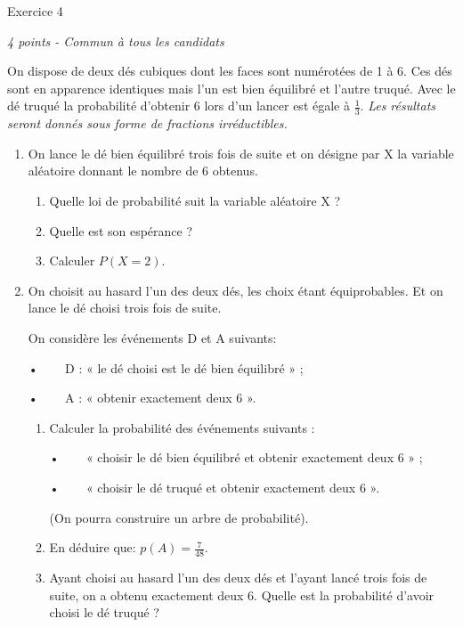 
%
\begin{h2}Exercice 4\end{h2}
\textit{4 points - Commun à tous les candidats}

On dispose de deux dés cubiques dont les faces sont numérotées de 1 à 6. Ces dés sont en apparence identiques mais l'un est bien équilibré et l'autre truqué. Avec le dé truqué la probabilité d'obtenir 6 lors d'un lancer est égale à $\frac{1}{3}$.
\textit{Les résultats seront donnés sous forme de fractions irréductibles.}
\begin{enumerate}
     \item
     On lance le dé bien équilibré trois fois de suite et on désigne par X la variable aléatoire donnant le nombre de 6 obtenus.
     \begin{enumerate}
          \item
          Quelle loi de probabilité suit la variable aléatoire X ?
          \item
          Quelle est son espérance ?
          \item
          Calculer $P\left(X=2\right)$.
     \end{enumerate}
     \item
     On choisit au hasard l'un des deux dés, les choix étant équiprobables. Et on lance le dé choisi trois fois de suite.
     \par
     On considère les événements D et A suivants:
     \par
     •ﾠﾠ D : « le dé choisi est le dé bien équilibré » ;
     \par
     •ﾠﾠ A : « obtenir exactement deux 6 ».
     \begin{enumerate}
          \item
          Calculer la probabilité des événements suivants :
          \par
          •ﾠﾠ « choisir le dé bien équilibré et obtenir exactement deux 6 » ;
          \par
          •ﾠﾠ « choisir le dé truqué et obtenir exactement deux 6 ».
          \par
          (On pourra construire un arbre de probabilité).
          \item
          En déduire que: $p\left(A\right)=\frac{7}{48}$.
          \item
          Ayant choisi au hasard l'un des deux dés et l'ayant lancé trois fois de suite, on a obtenu exactement deux 6. Quelle est la probabilité d'avoir choisi le dé truqué ?

\end{enumerate}
\end{enumerate}
